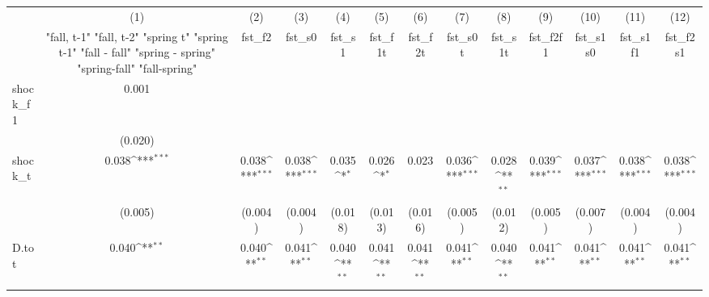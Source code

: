 {
\def\sym#1{\ifmmode^{#1}\else\(^{#1}\)\fi}
\begin{tabular}{l*{12}{c}}
\toprule
            &\multicolumn{1}{c}{(1)}&\multicolumn{1}{c}{(2)}&\multicolumn{1}{c}{(3)}&\multicolumn{1}{c}{(4)}&\multicolumn{1}{c}{(5)}&\multicolumn{1}{c}{(6)}&\multicolumn{1}{c}{(7)}&\multicolumn{1}{c}{(8)}&\multicolumn{1}{c}{(9)}&\multicolumn{1}{c}{(10)}&\multicolumn{1}{c}{(11)}&\multicolumn{1}{c}{(12)}\\
            &\multicolumn{1}{c}{  "fall, t-1" "fall, t-2" "spring t" "spring t-1"  "fall - fall" "spring - spring" "spring-fall" "fall-spring" }&\multicolumn{1}{c}{fst\_f2}&\multicolumn{1}{c}{fst\_s0}&\multicolumn{1}{c}{fst\_s1}&\multicolumn{1}{c}{fst\_f1t}&\multicolumn{1}{c}{fst\_f2t}&\multicolumn{1}{c}{fst\_s0t}&\multicolumn{1}{c}{fst\_s1t}&\multicolumn{1}{c}{fst\_f2f1}&\multicolumn{1}{c}{fst\_s1s0}&\multicolumn{1}{c}{fst\_s1f1}&\multicolumn{1}{c}{fst\_f2s1}\\
\midrule
shock\_f1    &       0.001         &                     &                     &                     &                     &                     &                     &                     &                     &                     &                     &                     \\
            &     (0.020)         &                     &                     &                     &                     &                     &                     &                     &                     &                     &                     &                     \\
\addlinespace
shock\_t     &       0.038\sym{***}&       0.038\sym{***}&       0.038\sym{***}&       0.035\sym{*}  &       0.026\sym{*}  &       0.023         &       0.036\sym{***}&       0.028\sym{**} &       0.039\sym{***}&       0.037\sym{***}&       0.038\sym{***}&       0.038\sym{***}\\
            &     (0.005)         &     (0.004)         &     (0.004)         &     (0.018)         &     (0.013)         &     (0.016)         &     (0.005)         &     (0.012)         &     (0.005)         &     (0.007)         &     (0.004)         &     (0.004)         \\
\addlinespace
D.tot       &       0.040\sym{**} &       0.040\sym{**} &       0.041\sym{**} &       0.040\sym{**} &       0.041\sym{**} &       0.041\sym{**} &       0.041\sym{**} &       0.040\sym{**} &       0.041\sym{**} &       0.041\sym{**} &       0.041\sym{**} &       0.041\sym{**} \\

\end{tabular}}
